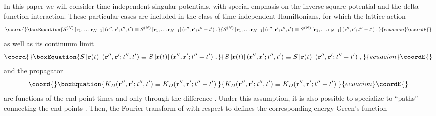 \documentclass[a4paper,preprint,draft,showpacs,amsmath,amsfonts,amssymb,aps,prd]{revtex4}%
\begin{document}
In this paper we
 will consider time-independent singular potentials,
with special emphasis on the inverse square potential and the delta-function
interaction.
These particular cases
are included in the class of time-independent
Hamiltonians, for which the lattice action
\begin{equation}\coord{}\boxEquation{
S^{(N)}  
 \left[ 
{\bf r}_{1},
\dots
{\bf r}_{N-1}
\right]  ({\bf r}'', {\bf r}' ; t'',t')  
 \equiv 
S^{(N)}  
 \left[ 
{\bf r}_{1},
\dots
{\bf r}_{N-1}
\right]  ({\bf r}'', {\bf r}' ; t''-t')  
\; ,
}{
S^{(N)}  
 \left[ 
{\bf r}_{1},
\dots
{\bf r}_{N-1}
\right]  ({\bf r}'', {\bf r}' ; t'',t')  
 \equiv 
S^{(N)}  
 \left[ 
{\bf r}_{1},
\dots
{\bf r}_{N-1}
\right]  ({\bf r}'', {\bf r}' ; t''-t')  
\; ,
}{ecuacion}\coordE{}\end{equation}
as well as its continuum limit
\begin{equation}\coord{}\boxEquation{
S \left[ {\bf r}(t)  \right]  ({\bf r}'', {\bf r}' ; t'',t')  
 \equiv 
S \left[ {\bf r}(t)  \right]  ({\bf r}'', {\bf r}' ; t''-t')  
\;  ,
}{
S \left[ {\bf r}(t)  \right]  ({\bf r}'', {\bf r}' ; t'',t')  
 \equiv 
S \left[ {\bf r}(t)  \right]  ({\bf r}'', {\bf r}' ; t''-t')  
\;  ,
}{ecuacion}\coordE{}\end{equation}
and the propagator
\begin{equation}\coord{}\boxEquation{
 K_{D}  ( {\bf r}'', {\bf r}' ; t'',t' )  
 \equiv  
K_{D}  ( {\bf r}'', {\bf r}' ; t''-t')  
\;
}{
 K_{D}  ( {\bf r}'', {\bf r}' ; t'',t' )  
 \equiv  
K_{D}  ( {\bf r}'', {\bf r}' ; t''-t')  
\;
}{ecuacion}\coordE{}\end{equation}
are functions of the end-point times
\coordHE{} and \coordHE{}
only through the difference \coordHE{}.
Under this assumption, it
is also possible to specialize to ``paths'' 
connecting the end points
\coordHE{}.
Then, the Fourier transform of \coordHE{}
with respect to \coordHE{} defines
the corresponding energy Green's function
\end{document}
